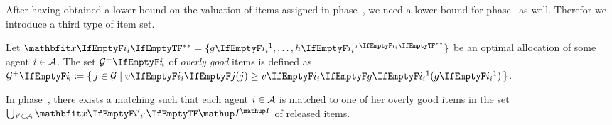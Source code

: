 After having obtained a lower bound on the valuation of items assigned in phase~\phaseii, we need a lower bound for phase~\phaseiii{} as well.
Therefor we introduce a third type of item set.
\begin{definition}
	Let \(\alloc* = \{ \asgd*{1}, \dots, \asgd{\alloclen*}\}\) be an optimal allocation of some agent \(i \in \mathcal{A}\).
	The set \(\overlygoodset\) of \emph{overly good} items is defined as \(\overlygoodset \coloneq \{\, j \in \goods \given \valuations[j] \geq \valuations[\asgd*{1}] \,\}\).
\end{definition}

\begin{lemma}
	\label{lem:overly_good_matching}
	In phase~\phaseiii, there exists a matching such that each agent \(i \in \mathcal{A}\) is matched to one of her overly good items in the set \(\mathop{\bigcup\hspace{-1pt}_{i' \in \agents}} \alloc[\phasei][i']\) of released items.
\end{lemma}
